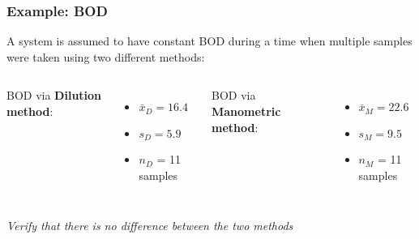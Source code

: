 \begin{frame}\frametitle{Example: BOD}
	A system is assumed to have constant BOD during a time when multiple samples were taken using two different methods:
	\begin{center}
	\end{center}
	\begin{columns}[t]
			BOD via \textbf{Dilution method}:
			\begin{itemize}
				\item	$\bar{x}_D = 16.4$
				\item	$s_D = 5.9$
				\item	$n_D$ = 11 samples
			\end{itemize}
			BOD via \textbf{Manometric method}:
			\begin{itemize}
				\item	$\bar{x}_M = 22.6$
				\item	$s_M = 9.5$
				\item	$n_M$ = 11 samples
			\end{itemize}
	\end{columns}
	\vspace{6pt}
	\emph{Verify that there is no difference between the two methods}
		
	
\end{frame}

